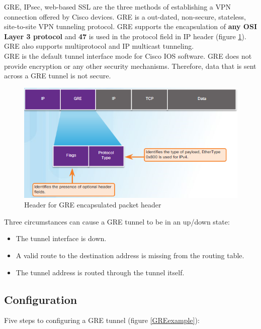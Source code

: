 GRE, IPsec, web-based SSL are the three methods of establishing a VPN connection offered by Cisco devices. GRE is a out-dated, non-secure, stateless, site-to-site VPN tunneling protocol. GRE supports the encapsulation of \textbf{any OSI Layer 3 protocol} and \textbf{47} is used in the protocol field in IP header (figure \ref{GREpacket}). GRE also supports multiprotocol and IP multicast tunneling.\\

GRE is the default tunnel interface mode for Cisco IOS software. GRE does not provide encryption or any other security mechanisms. Therefore, data that is sent across a GRE tunnel is not secure.\\

\begin{figure}[hbtp]
\caption{Header for GRE encapsulated packet header}\label{GREpacket}
\centering
\includegraphics[scale=1]{pictures/GREpacket.PNG}
\end{figure}

Three circumstances can cause a GRE tunnel to be in an up/down state:
\begin{itemize}
\item The tunnel interface is down.
\item A valid route to the destination address is missing from the routing table.
\item The tunnel address is routed through the tunnel itself.
\end{itemize}

\subsection{Configuration}

Five steps to configuring a GRE tunnel (figure \ref{GREexample}):

